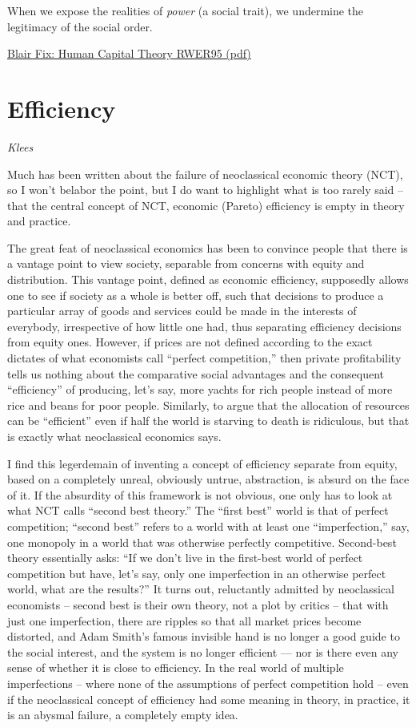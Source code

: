 \documentclass[
]{book}
\begin{document}
When we expose
the realities of \emph{power} (a social trait), we undermine the legitimacy of the social order.

\href{pdf/Fix_2021_Human_Capital_RWER95.pdf}{Blair Fix: Human Capital Theory RWER95 (pdf)}

\hypertarget{efficiency}{%
\section{Efficiency}\label{efficiency}}

\emph{Klees}

Much has been written about the failure of neoclassical economic theory (NCT), so I won't belabor the point, but I do want to highlight what is too rarely said -- that the central concept of NCT, economic (Pareto) efficiency is empty in theory and practice.

The great feat of neoclassical economics has been to convince people that there is a vantage point to view society, separable from concerns with equity and distribution. This vantage point, defined as economic efficiency, supposedly allows one to see if society as a whole is better off, such that decisions to produce a particular array of goods and services could be made in the interests of everybody, irrespective of how little one had, thus separating efficiency decisions from equity ones. However, if prices are not defined according to the exact dictates of what economists call ``perfect competition,'' then private profitability tells us nothing about the comparative social advantages and the consequent ``efficiency'' of producing, let's say, more yachts for rich people instead of more rice and beans for poor people. Similarly, to argue that the allocation of resources can be ``efficient'' even if half the world is starving to death is ridiculous, but that is exactly what neoclassical economics says.

I find this legerdemain of inventing a concept of efficiency separate from equity, based on a completely unreal, obviously untrue, abstraction, is absurd on the face of it. If the absurdity of this framework is not obvious, one only has to look at what NCT calls ``second best theory.'' The ``first best'' world is that of perfect competition; ``second best'' refers to a world with at least one ``imperfection,'' say, one monopoly in a world that was otherwise perfectly competitive. Second-best theory essentially asks: ``If we don't live in the first-best world of perfect competition but have, let's say, only one imperfection in an otherwise perfect world, what are the results?'' It turns out, reluctantly admitted by neoclassical economists -- second best is their own theory, not a plot by critics -- that with just one imperfection, there are ripples so that all market prices become distorted, and Adam Smith's famous invisible hand is no longer a good guide to the social interest, and the system is no longer efficient --- nor is there even any sense of whether it is close to efficiency. In the real world of multiple imperfections -- where none of the assumptions of perfect competition hold -- even if the neoclassical concept of efficiency had some meaning in theory, in practice, it is an abysmal failure, a completely empty idea.
\end{document}
